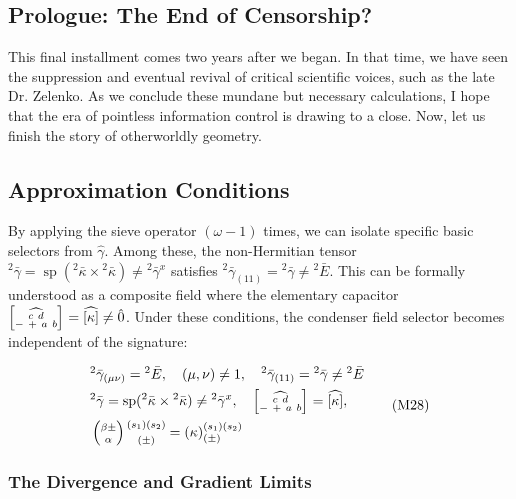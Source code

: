 \documentclass[11pt,a4paper,oneside]{article}
\DeclareMathOperator{\spn}{sp}
\newcommand{\metroncap}[4][]{%
    \left[ \renewcommand{\arraystretch}{0.85} \substack{#2 \\ #3 \ #4} \right]_{#1}%
}
\begin{document}
\subsection{Prologue: The End of Censorship?}

This final installment comes two years after we began. In that time, we have seen the suppression and eventual revival of critical scientific voices, such as the late Dr. Zelenko. As we conclude these mundane but necessary calculations, I hope that the era of pointless information control is drawing to a close. Now, let us finish the story of otherworldly geometry.

\subsection{Approximation Conditions}

By applying the sieve operator $(\omega-1)$ times, we can isolate specific basic selectors from $\hat{\gamma}$. Among these, the non-Hermitian tensor ${}^2\bar{\gamma} = \spn({}^2\bar{\kappa} \times {}^2\bar{\kappa}) \neq {}^2\bar{\gamma}^x$ satisfies ${}^2\bar{\gamma}_{(11)} = {}^2\bar{\gamma} \neq {}^2\bar{E}$. This can be formally understood as a composite field where the elementary capacitor $\metroncap{\widehat{c\ d}}{-\ +}{a\ b} = \widehat{[\kappa]} \neq \hat{0}$. Under these conditions, the condenser field selector becomes independent of the signature:

\begin{equation}
\begin{split}
    &{}^2\bar{\gamma}_{(\mu \nu)} = {}^2\bar{E}, \quad (\mu,\nu) \neq 1, \quad {}^2\bar{\gamma}_{(11)} = {}^2\bar{\gamma} \neq {}^2\bar{E} \\
    &{}^2\bar{\gamma} = \spn({}^2\bar{\kappa} \times {}^2\bar{\kappa}) \neq {}^2\bar{\gamma}^x, \quad \metroncap{\widehat{c\ d}}{-\ +}{a\ b} = \widehat{[\kappa]}, \\
    &\left(\substack{\beta \pm \\[3pt] \alpha}\right) \substack{(s_1)(s_2) \\[3pt] (\pm)} = (\kappa)_{(\pm)}^{(s_1)(s_2)}
\end{split} \tag{M28}
\end{equation}

\subsubsection{The Divergence and Gradient Limits}
\end{document}
